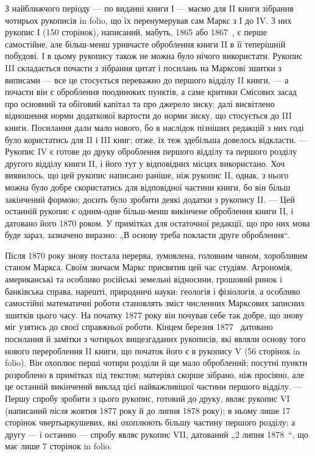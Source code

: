 З найближчого періоду — по виданні книги І — маємо для II книги зібрання
чотирьох рукописів in folio, що їх перенумерував сам Маркс з
І до IV. З них рукопис І (150 сторінок), написаний, мабуть, 1865 або
1867~, є перше самостійне, але більш-менш уривчасте оброблення
книги II в її теперішній побудові. І в цьому рукопису також не можна
було нічого використати. Рукопис III складається почасти з зібрання
цитат і посилань на Марксові зшитки з виписами — все це стосується переважно
до першого відділу II книги, — а почасти він є оброблення поодиноких
пунктів, а саме критики Смісових засад про основний та обіговий
капітал та про джерело зиску; далі висвітлено відношення норми
додаткової вартости до норми зиску, що стосується до III книги. Посилання
дали мало нового, бо в наслідок пізніших редакцій з них годі
було користатись для II і III книг; отже, їх теж здебільша довелось відкласти.
— Рукопис IV є готове до друку оброблення першого відділу та
першого розділу другого відділу книги II, і його тут у відповідних місцях
використано. Хоч виявилось, що цей рукопис написано раніше, ніж
рукопис II, однак, з нього можна було добре скористатись для відповідної
частини книги, бо він більш закінчений формою; досить було
зробити деякі додатки з рукопису II. — Цей останній рукопис є одним-одне
більш-менш викінчене оброблення книги II, і датовано його
1870 роком. У примітках для остаточної редакції, що про них мова
буде зараз, зазначено виразно: „В основу треба покласти друге оброблення“.

Після 1870 року знову постала перерва, зумовлена, головним чином,
хоробливим станом Маркса. Своїм звичаєм Маркс присвятив цей час
студіям. Агрономія, американські та особливо російські земельні відносини,
грошовий ринок і банківська справа, нарешті, природничі науки:
геологія і фізіологія, а особливо самостійні математичні роботи становлять
зміст численних Марксових записних зшитків цього часу. На початку
1877 року він почував себе так добре, що знову міг узятись
до своєї справжньої роботи. Кінцем березня 1877~ датовано посилання
й замітки з чотирьох вищезгаданих рукописів, які являли основу
того нового перероблення II книги, що початок його є в рукопису V
(56 сторінок in folio). Він охоплює перші чотири розділи й ще мало
оброблений; посутні пункти розроблено в примітках під текстом; матеріял
скорше зібрано, ніж просіяно, але це останній викінчений виклад цієї найважливішої
частини першого відділу. — Першу спробу зробити з цього
рукопис, готовий до друку, являє рукопис VI (написаний \emph{після} жовтня
1877 року й до липня 1878 року); в ньому лише 17 сторінок чвертьаркушевих,
які охоплюють більшу частину першого розділу; а другу — і
останню — спробу являє рукопис VII, датований „2 липня 1878~“, що
має лише 7 сторінок in folio.

